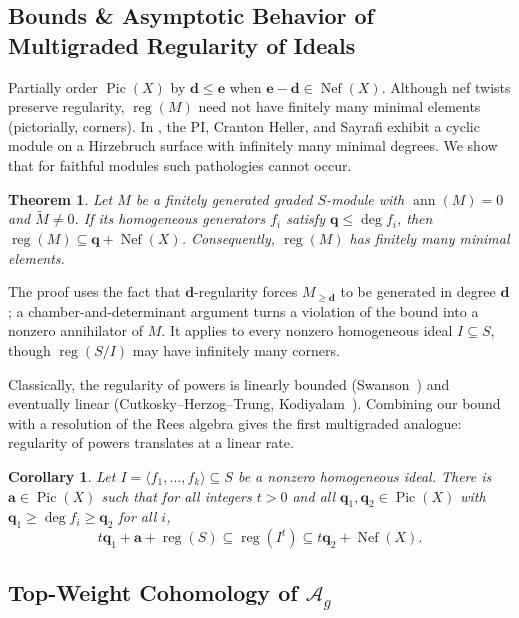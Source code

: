\documentclass[11pt,reqno]{amsart}
\newtheorem{theorem}[lemma]{Theorem}
\newtheorem{cor}[lemma]{Corollary}
\theoremstyle{remark}
\newcommand{\reg}{\operatorname{reg}}
\newcommand{\ann}{\operatorname{ann}}
\newcommand{\Pic}{\operatorname{Pic}}
\newcommand{\Nef}{\operatorname{Nef}}
\renewcommand{\aa}{\mathbf{a}}
\newcommand{\dd}{\mathbf{d}}
\newcommand{\ee}{\mathbf{e}}
\newcommand{\qq}{\mathbf{q}}
\begin{document}
\subsection{Bounds \& Asymptotic Behavior of Multigraded Regularity of Ideals}

Partially order $\Pic(X)$ by $\dd\leq\ee$ when $\ee-\dd\in \Nef(X)$. Although nef twists preserve regularity, $\reg(M)$ need not have finitely many minimal elements (pictorially, corners). In \cite[Ex.~1.1]{bruceHellerSayrafi22}, the PI, Cranton Heller, and Sayrafi exhibit a cyclic module on a Hirzebruch surface with infinitely many minimal degrees. We show that for faithful modules such pathologies cannot occur.

\begin{theorem}\cite[Cor.~4.6]{bruceHellerSayrafi22}
Let $M$ be a finitely generated graded $S$-module with $\ann(M)=0$ and $\widetilde M\neq0$. If its homogeneous generators $f_i$ satisfy $\qq\leq\deg f_i$, then $\reg(M)\subseteq\qq+\Nef(X)$. Consequently, $\reg(M)$ has finitely many minimal elements.
\end{theorem}
The proof uses the fact that $\dd$-regularity forces $M_{\geq\dd}$ to be generated in degree $\dd$; a chamber-and-determinant argument turns a violation of the bound into a nonzero annihilator of $M$. It applies to every nonzero homogeneous ideal $I\subseteq S$, though $\reg(S/I)$ may have infinitely many corners.

Classically, the regularity of powers is linearly bounded (Swanson~\cite{swanson97}) and eventually linear (Cutkosky--Herzog--Trung, Kodiyalam~\cite{CHT99,Kodiyalam00}). Combining our bound with a resolution of the Rees algebra gives the first multigraded analogue: regularity of powers translates at a linear rate.
 
\begin{cor}\cite[Thm.~5.1]{bruceHellerSayrafi22}
Let $I=\langle f_1,\ldots,f_k\rangle\subseteq S$ be a nonzero homogeneous ideal. There is $\aa\in\Pic(X)$ such that for all integers $t>0$ and all $\qq_1,\qq_2\in\Pic(X)$ with $\qq_1\geq\deg f_i\geq\qq_2$ for all $i$,
\[
t\qq_1+\aa+\reg(S)\subseteq\reg(I^t)\subseteq t\qq_2+\Nef(X).
\]
\end{cor}

\subsection{Top-Weight Cohomology of $\mathcal{A}_{g}$}\label{subsec:prior:cohomology-of-ag}
\end{document}
